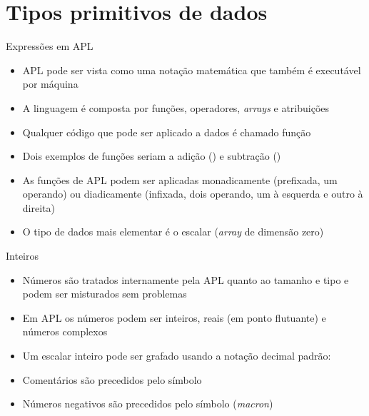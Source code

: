 \section{Tipos primitivos de dados}

\begin{frame}[fragile]{Expressões em APL}

    \begin{itemize}
        \item APL pode ser vista como uma notação matemática que também é executável por máquina
        \pause

        \item A linguagem é composta por funções, operadores, \textit{arrays} e atribuições
        \pause

        \item Qualquer código que pode ser aplicado a dados é chamado função 
        \pause

        \item Dois exemplos de funções seriam a adição () e subtração ()
        \pause

        \item As funções de APL podem ser aplicadas monadicamente (prefixada, um operando) ou diadicamente (infixada, dois operando, um à esquerda e outro à direita)
        \pause

        \item O tipo de dados mais elementar é o escalar (\textit{array} de dimensão zero)
    \end{itemize}

\end{frame}

\begin{frame}[fragile]{Inteiros}

    \begin{itemize}
        \item Números são tratados internamente pela APL quanto ao tamanho e tipo e podem ser misturados sem problemas
        \pause

        \item Em APL os números podem ser inteiros, reais (em ponto flutuante) e números complexos

        \item Um escalar inteiro pode ser grafado usando a notação decimal padrão:
        \pause

        \item Comentários são precedidos pelo símbolo 
        \pause

        \item Números negativos são precedidos pelo símbolo  (\textit{macron})

    \end{itemize}

\end{frame}


